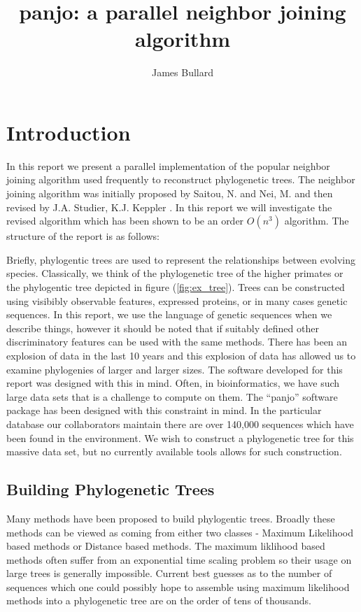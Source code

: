 \documentclass[letterpaper,12pt]{article}
\title{panjo: a parallel neighbor joining algorithm}
\author{James Bullard}
\begin{document}
\maketitle
\tableofcontents

\section{Introduction}
In this report we present a parallel implementation of the popular
neighbor joining algorithm used frequently to reconstruct phylogenetic
trees. The neighbor joining algorithm was initially proposed by
Saitou, N. and Nei, M. \cite{saitou1987the} and then revised by
J.A. Studier, K.J. Keppler \cite{studier_kepler_1988}. In this report
we will investigate the revised algorithm which has been shown to be
an order $O(n^3)$ algorithm. The structure of the report is as
follows:

Briefly, phylogentic trees are used to represent the relationships
between evolving species. Classically, we think of the phylogenetic
tree of the higher primates or the phylogentic tree depicted in figure
(\ref{fig:ex_tree}). Trees can be constructed using visibibly
observable features, expressed proteins, or in many cases
genetic sequences. In this report, we use the language of
genetic sequences when we describe things, however it should be
noted that if suitably defined other discriminatory features can be
used with the same methods. There has been an explosion of data in the
last 10 years and this explosion of data has allowed us to examine
phylogenies of larger and larger sizes. The software developed for
this report was designed with this in mind. Often, in bioinformatics,
we have such large data sets that is a challenge to compute on
them. The ``panjo'' software package has been designed with this
constraint in mind. In the particular database our collaborators
maintain \cite{desantis_greengenes} there are over 140,000
sequences which have been found in the environment. We wish to
construct a phylogenetic tree for this massive data set, but no
currently available tools allows for such construction.  

\subsection{Building Phylogenetic Trees}
Many methods have been proposed to build phylogentic trees. Broadly
these methods can be viewed as coming from either two classes -
Maximum Likelihood based methods or Distance based methods. The
maximum liklihood based methods often suffer from an exponential time
scaling problem so their usage on large trees is generally
impossible. Current best guesses as to the number of sequences which
one could possibly hope to assemble using maximum likelihood methods
into a phylogenetic tree are on the order of tens of thousands.
\end{document}
